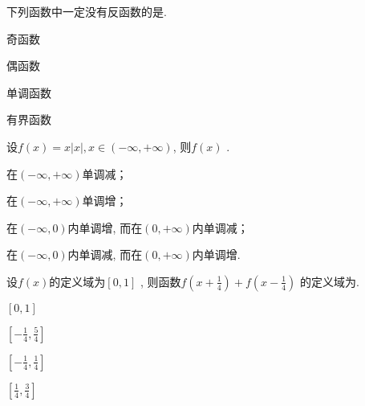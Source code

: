 			\begin{problem}下列函数中一定没有反函数的是.
			
			\begin{abcd} \item 奇函数
				
				\item 偶函数
				
				\item 单调函数
				
				\item 有界函数
				
		\end{abcd}  \end{problem}
		
		\begin{problem}
			设$f\left( x \right) = x\left| x \right|,x \in \left( - \infty, + \infty \right)$, 则$f\left( x \right)$
			.
			
			
			\begin{abcd} \item 在$\left( - \infty, + \infty \right)$单调减；
				
				\item 在$\left( - \infty, + \infty \right)$单调增；
				
				\item
				在$\left( - \infty,0 \right)$内单调增, 而在$\left( 0, + \infty \right)$内单调减；
				
				\item
				在$\left( - \infty,0 \right)$内单调减, 而在$\left( 0, + \infty \right)$内单调增.
				
		\end{abcd}  \end{problem}
		
		\begin{problem}
			设$f\left( x \right)$的定义域为$\left\lbrack 0,1 \right\rbrack$
			, 则函数$\displaystyle f\left( x + \frac{1}{4} \right) + f\left( x - \frac{1}{4} \right)$
			的定义域为\pickin{D}.
			
			
			\begin{abcd} \item $\displaystyle \left\lbrack 0,1 \right\rbrack$
				
				\item$\displaystyle \left\lbrack - \frac{1}{4},\frac{5}{4} \right\rbrack$
				
				\item $\displaystyle \left\lbrack - \frac{1}{4},\frac{1}{4} \right\rbrack$
				
				\item $\displaystyle \left\lbrack \frac{1}{4},\frac{3}{4} \right\rbrack$
				
		\end{abcd}  \end{problem}
		
